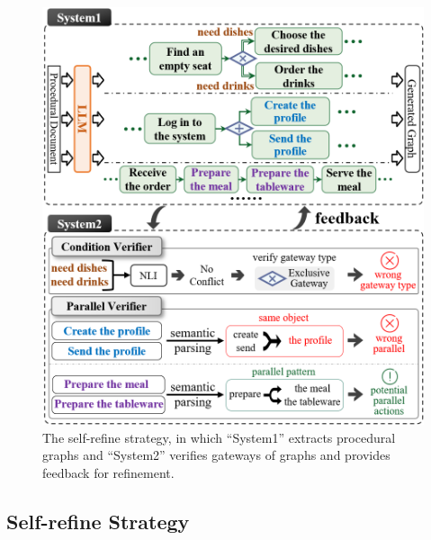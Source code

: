 \begin{figure}[!t]
    \centering
    \includegraphics[width=1\linewidth]{figures/Method.png}

    \caption{The self-refine strategy, in which ``System1'' extracts procedural graphs and ``System2'' verifies gateways of graphs and provides feedback for refinement.
    }
    \label{fig:method}

\end{figure}

\phantom{Invisible Text}
\vspace{-\baselineskip}


\subsection{Self-refine Strategy
}

